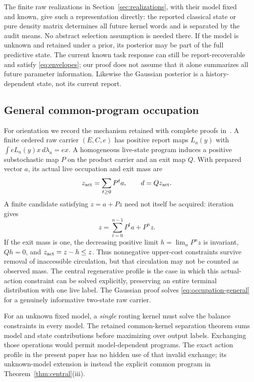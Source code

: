 The finite raw realizations in Section~\ref{sec:realizations}, with their model fixed and known, give such a representation directly: the reported classical state or pure density matrix determines all future kernel words and is separated by the audit means. No abstract selection assumption is needed there. If the model is unknown and retained under a prior, its posterior may be part of the full predictive state. The current known task response can still be report-recoverable and satisfy \eqref{eq:envelopes}; our proof does not assume that it alone summarizes all future parameter information. Likewise the Gaussian posterior is a history-dependent state, not its current report.

\subsection*{General common-program occupation}
For orientation we record the mechanism retained with complete proofs in~\cite{GTF49}. A finite ordered raw carrier $(E,C,e)$ has positive report maps $L_a(y)$ with $\int eL_a(y)x\,d\lambda_a=e x$. A homogeneous live-state program induces a positive substochastic map $P$ on the product carrier and an exit map $Q$. With prepared vector $a$, its actual live occupation and exit mass are
\begin{equation}\label{eq:occupation-general}
 z_{\rm act}=\sum_{t\ge0}P^ta,\qquad d=Qz_{\rm act}.
\end{equation}
A finite candidate satisfying $z=a+Pz$ need not itself be acquired: iteration gives
\[
 z=\sum_{t=0}^{n-1}P^ta+P^nz.
\]
If the exit mass is one, the decreasing positive limit $h=\lim_nP^nz$ is invariant, $Qh=0$, and $z_{\rm act}=z-h\le z$. Thus nonnegative upper-cost constraints survive removal of inaccessible circulation, but that circulation may not be counted as observed mass. The central regenerative profile is the case in which this actual-action constraint can be solved explicitly, preserving an entire terminal distribution with one live label. The Gaussian proof solves \eqref{eq:occupation-general} for a genuinely informative two-state raw carrier.

For an unknown fixed model, a \emph{single} routing kernel must solve the balance constraints in every model. The retained common-kernel separation theorem sums model and state contributions before maximizing over output labels. Exchanging those operations would permit model-dependent programs. The exact action profile in the present paper has no hidden use of that invalid exchange; its unknown-model extension is instead the explicit common program in Theorem~\ref{thm:central}\textup{(iii)}.


